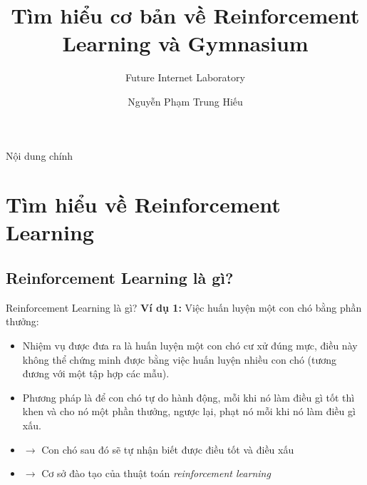 \documentclass[10pt,aspectratio=169]{beamer}
\title{Tìm hiểu cơ bản về Reinforcement Learning và Gymnasium}
\subtitle{Future Internet Laboratory}
\author{Nguyễn Phạm Trung Hiếu}
\begin{document}
\maketitle

\begingroup
    \begin{frame}{Nội dung chính}{}
        \tableofcontents
    \end{frame}
\endgroup

\section{Tìm hiểu về Reinforcement Learning}

\subsection{Reinforcement Learning là gì?}

\begin{frame}{Reinforcement Learning là gì?}
\textbf{Ví dụ 1:} Việc huấn luyện một con chó bằng phần thưởng:
\begin{itemize}
\setlength\itemsep{8pt}
\item Nhiệm vụ được đưa ra là huấn luyện một con chó cư xử đúng mực, điều này không thể chứng minh được bằng việc huấn luyện nhiều con chó (tương đương với một tập hợp các mẫu).
\item Phương pháp là để con chó tự do hành động, mỗi khi nó làm điều gì tốt thì khen và cho nó một phần thưởng, ngược lại, phạt nó mỗi khi nó làm điều gì xấu.
\item[] $ \longrightarrow $ Con chó sau đó sẽ tự nhận biết được điều tốt và điều xấu
\item[] $ \longrightarrow $ Cơ sở đào tạo của thuật toán \textcolor{mainblue}{\textit{reinforcement learning}}
\end{itemize}
\end{frame}
\end{document}
